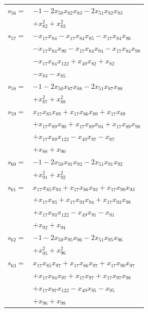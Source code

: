 \begin{longtable}{@{}r@{\;}l@{}}
\(s_{56}=\) & \(\displaystyle -1 -2x_{50}x_{82}x_{83} -2x_{51}x_{82}x_{83}\) \\
 & \(\displaystyle +x_{82}^{2} +x_{83}^{2}\) \\[3pt]
\(s_{57}=\) & \(\displaystyle -x_{17}x_{84} -x_{17}x_{84}x_{85} -x_{17}x_{84}x_{86}\) \\
 & \(\displaystyle -x_{17}x_{84}x_{90} -x_{17}x_{84}x_{94} -x_{17}x_{84}x_{98}\) \\
 & \(\displaystyle -x_{17}x_{84}x_{122} +x_{49}x_{82} +x_{82}\) \\
 & \(\displaystyle -x_{83} -x_{85}\) \\[3pt]
\(s_{58}=\) & \(\displaystyle -1 -2x_{50}x_{87}x_{88} -2x_{51}x_{87}x_{88}\) \\
 & \(\displaystyle +x_{87}^{2} +x_{88}^{2}\) \\[3pt]
\(s_{59}=\) & \(\displaystyle x_{17}x_{85}x_{89} +x_{17}x_{86}x_{89} +x_{17}x_{89}\) \\
 & \(\displaystyle +x_{17}x_{89}x_{90} +x_{17}x_{89}x_{94} +x_{17}x_{89}x_{98}\) \\
 & \(\displaystyle +x_{17}x_{89}x_{122} -x_{49}x_{87} -x_{87}\) \\
 & \(\displaystyle +x_{88} +x_{90}\) \\[3pt]
\(s_{60}=\) & \(\displaystyle -1 -2x_{50}x_{91}x_{92} -2x_{51}x_{91}x_{92}\) \\
 & \(\displaystyle +x_{91}^{2} +x_{92}^{2}\) \\[3pt]
\(s_{61}=\) & \(\displaystyle x_{17}x_{85}x_{93} +x_{17}x_{86}x_{93} +x_{17}x_{90}x_{93}\) \\
 & \(\displaystyle +x_{17}x_{93} +x_{17}x_{93}x_{94} +x_{17}x_{93}x_{98}\) \\
 & \(\displaystyle +x_{17}x_{93}x_{122} -x_{49}x_{91} -x_{91}\) \\
 & \(\displaystyle +x_{92} +x_{94}\) \\[3pt]
\(s_{62}=\) & \(\displaystyle -1 -2x_{50}x_{95}x_{96} -2x_{51}x_{95}x_{96}\) \\
 & \(\displaystyle +x_{95}^{2} +x_{96}^{2}\) \\[3pt]
\(s_{63}=\) & \(\displaystyle x_{17}x_{85}x_{97} +x_{17}x_{86}x_{97} +x_{17}x_{90}x_{97}\) \\
 & \(\displaystyle +x_{17}x_{94}x_{97} +x_{17}x_{97} +x_{17}x_{97}x_{98}\) \\
 & \(\displaystyle +x_{17}x_{97}x_{122} -x_{49}x_{95} -x_{95}\) \\
 & \(\displaystyle +x_{96} +x_{98}\) \\[3pt]

\end{longtable}
